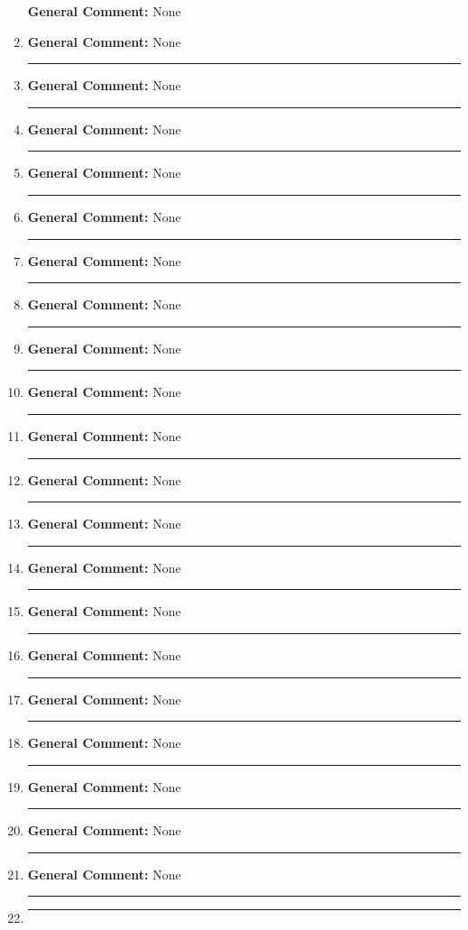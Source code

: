 \documentclass{extbook}[14pt]
\newcommand{\litem}[1]{\item#1\hspace*{-1cm}\rule{\textwidth}{0.4pt}}
\begin{document}
\begin{enumerate}
{\textbf{General Comment:} None
}
\litem{



\textbf{General Comment:} None
}
\litem{



\textbf{General Comment:} None
}
\litem{



\textbf{General Comment:} None
}
\litem{



\textbf{General Comment:} None
}
\litem{



\textbf{General Comment:} None
}
\litem{



\textbf{General Comment:} None
}
\litem{



\textbf{General Comment:} None
}
\litem{



\textbf{General Comment:} None
}
\litem{



\textbf{General Comment:} None
}
\litem{



\textbf{General Comment:} None
}
\litem{



\textbf{General Comment:} None
}
\litem{



\textbf{General Comment:} None
}
\litem{



\textbf{General Comment:} None
}
\litem{



\textbf{General Comment:} None
}
\litem{



\textbf{General Comment:} None
}
\litem{



\textbf{General Comment:} None
}
\litem{



\textbf{General Comment:} None
}
\litem{



\textbf{General Comment:} None
}
\litem{



\textbf{General Comment:} None
}
\litem{



\textbf{General Comment:} None
}
\litem{



}
\end{enumerate}
\end{document}
